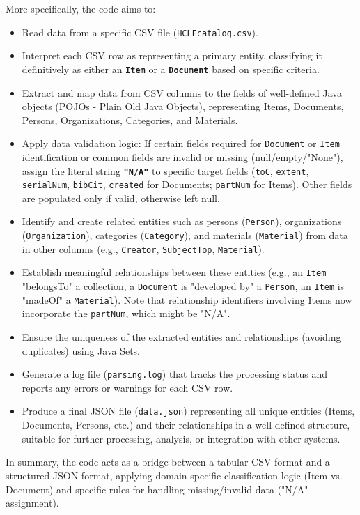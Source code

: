\documentclass[11pt, a4paper]{article}
\begin{document}
More specifically, the code aims to:
\begin{itemize}
    \item Read data from a specific CSV file (\texttt{HCLEcatalog.csv}).
    \item Interpret each CSV row as representing a primary entity, classifying it definitively as either an \textbf{\texttt{Item}} or a \textbf{\texttt{Document}} based on specific criteria.
    \item Extract and map data from CSV columns to the fields of well-defined Java objects (POJOs - Plain Old Java Objects), representing Items, Documents, Persons, Organizations, Categories, and Materials.
    \item Apply data validation logic: If certain fields required for \texttt{Document} or \texttt{Item} identification or common fields are invalid or missing (null/empty/"None"), assign the literal string \textbf{\texttt{"N/A"}} to specific target fields (\texttt{toC}, \texttt{extent}, \texttt{serialNum}, \texttt{bibCit}, \texttt{created} for Documents; \texttt{partNum} for Items). Other fields are populated only if valid, otherwise left null.
    \item Identify and create related entities such as persons (\texttt{Person}), organizations (\texttt{Organization}), categories (\texttt{Category}), and materials (\texttt{Material}) from data in other columns (e.g., \texttt{Creator}, \texttt{SubjectTop}, \texttt{Material}).
    \item Establish meaningful relationships between these entities (e.g., an \texttt{Item} "belongsTo" a collection, a \texttt{Document} is "developed by" a \texttt{Person}, an \texttt{Item} is "madeOf" a \texttt{Material}). Note that relationship identifiers involving Items now incorporate the \texttt{partNum}, which might be "N/A".
    \item Ensure the uniqueness of the extracted entities and relationships (avoiding duplicates) using Java Sets.
    \item Generate a log file (\texttt{parsing.log}) that tracks the processing status and reports any errors or warnings for each CSV row.
    \item Produce a final JSON file (\texttt{data.json}) representing all unique entities (Items, Documents, Persons, etc.) and their relationships in a well-defined structure, suitable for further processing, analysis, or integration with other systems.
\end{itemize}
In summary, the code acts as a bridge between a tabular CSV format and a structured JSON format, applying domain-specific classification logic (Item vs. Document) and specific rules for handling missing/invalid data ("N/A" assignment).
\end{document}
